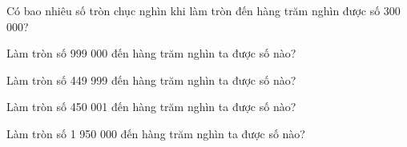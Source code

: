 \begin{ex}
Có bao nhiêu số tròn chục nghìn khi làm tròn đến hàng trăm nghìn được số 300 000?
\end{ex}

\begin{ex}
Làm tròn số 999 000 đến hàng trăm nghìn ta được số nào?
\end{ex}

\begin{ex}
Làm tròn số 449 999 đến hàng trăm nghìn ta được số nào?
\end{ex}

\begin{ex}
Làm tròn số 450 001 đến hàng trăm nghìn ta được số nào?
\end{ex}

\begin{ex}
Làm tròn số 1 950 000 đến hàng trăm nghìn ta được số nào?
\end{ex}
